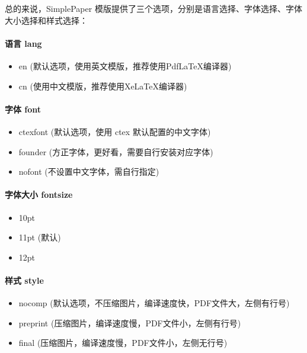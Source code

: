 总的来说，SimplePaper 模版提供了三个选项，分别是语言选择、字体选择、字体大小选择和样式选择：

\paragraph{语言 lang}
\begin{itemize}
    \item en (默认选项，使用英文模版，推荐使用PdfLaTeX编译器)
    \item cn (使用中文模版，推荐使用XeLaTeX编译器)
\end{itemize}

\paragraph{字体 font}
\begin{itemize}
    \item ctexfont (默认选项，使用 ctex 默认配置的中文字体)
    \item founder (方正字体，更好看，需要自行安装对应字体)
    \item nofont (不设置中文字体，需自行指定)
\end{itemize}

\paragraph{字体大小 fontsize}
\begin{itemize}
    \item 10pt 
    \item 11pt (默认)
    \item 12pt 
\end{itemize}

\paragraph{样式 style}
\begin{itemize}
    \item nocomp (默认选项，不压缩图片，编译速度快，PDF文件大，左侧有行号)
    \item preprint (压缩图片，编译速度慢，PDF文件小，左侧有行号)
    \item final (压缩图片，编译速度慢，PDF文件小，左侧无行号)
\end{itemize}
